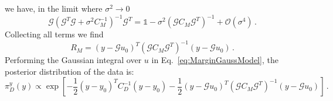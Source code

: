 we have, in the limit where $\sigma^2 \to 0$
\begin{equation}
    \label{eq:QuadraticYTerm}
    \mathcal{G} \left(\mathcal{G}^T \mathcal{G} + \sigma^2 C_M^{-1}\right)^{-1} 
    \mathcal{G}^T = 
    \mathds{1} - \sigma^2 \left(\mathcal{G} C_M \mathcal{G}^T\right)^{-1} + 
    \mathcal{O}(\sigma^4)\, .
\end{equation}
Collecting all terms we find
\begin{equation}
    \label{eq:RMAfterLimit}
    R_M = \left(y - \mathcal{G} u_0\right)^T 
        \left(\mathcal{G} C_M \mathcal{G}^T\right)^{-1}
        \left(y- \mathcal{G} u_0\right)\, .
\end{equation}
Performing the Gaussian integral over $u$ in Eq.~\ref{eq:MarginGaussModel}, the
posterior distribution of the data is:
\begin{equation}
    \label{eq:PosteriorDataDistr}
    \pi_D^y(y) \propto 
    \exp\left[-\frac12 \left(y-y_0\right)^T C_D^{-1} \left(y - y_0\right)
    -\frac12 \left(y - \mathcal{G} u_0\right)^T 
    \left(\mathcal{G} C_M \mathcal{G}^T\right)^{-1}
    \left(y - \mathcal{G} u_0\right)
    \right]\, .
\end{equation}